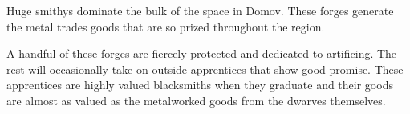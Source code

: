 Huge smithys dominate the bulk of the space in Domov.
These forges generate the metal trades goods that are so prized throughout the region.

A handful of these forges are fiercely protected and dedicated to artificing.
The rest will occasionally take on outside apprentices that show good promise.
These apprentices are highly valued blacksmiths when they graduate and their goods are almost as valued as the metalworked goods from the dwarves themselves.
